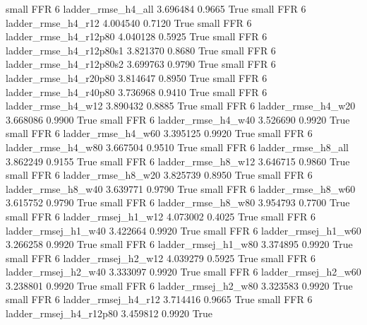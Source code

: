      small      FFR                 6       ladder_rmse_h4_all   3.696484      0.9665    True
     small      FFR                 6       ladder_rmse_h4_r12   4.004540      0.7120    True
     small      FFR                 6    ladder_rmse_h4_r12p80   4.040128      0.5925    True
     small      FFR                 6  ladder_rmse_h4_r12p80s1   3.821370      0.8680    True
     small      FFR                 6  ladder_rmse_h4_r12p80s2   3.699763      0.9790    True
     small      FFR                 6    ladder_rmse_h4_r20p80   3.814647      0.8950    True
     small      FFR                 6    ladder_rmse_h4_r40p80   3.736968      0.9410    True
     small      FFR                 6       ladder_rmse_h4_w12   3.890432      0.8885    True
     small      FFR                 6       ladder_rmse_h4_w20   3.668086      0.9900    True
     small      FFR                 6       ladder_rmse_h4_w40   3.526690      0.9920    True
     small      FFR                 6       ladder_rmse_h4_w60   3.395125      0.9920    True
     small      FFR                 6       ladder_rmse_h4_w80   3.667504      0.9510    True
     small      FFR                 6       ladder_rmse_h8_all   3.862249      0.9155    True
     small      FFR                 6       ladder_rmse_h8_w12   3.646715      0.9860    True
     small      FFR                 6       ladder_rmse_h8_w20   3.825739      0.8950    True
     small      FFR                 6       ladder_rmse_h8_w40   3.639771      0.9790    True
     small      FFR                 6       ladder_rmse_h8_w60   3.615752      0.9790    True
     small      FFR                 6       ladder_rmse_h8_w80   3.954793      0.7700    True
     small      FFR                 6      ladder_rmsej_h1_w12   4.073002      0.4025    True
     small      FFR                 6      ladder_rmsej_h1_w40   3.422664      0.9920    True
     small      FFR                 6      ladder_rmsej_h1_w60   3.266258      0.9920    True
     small      FFR                 6      ladder_rmsej_h1_w80   3.374895      0.9920    True
     small      FFR                 6      ladder_rmsej_h2_w12   4.039279      0.5925    True
     small      FFR                 6      ladder_rmsej_h2_w40   3.333097      0.9920    True
     small      FFR                 6      ladder_rmsej_h2_w60   3.238801      0.9920    True
     small      FFR                 6      ladder_rmsej_h2_w80   3.323583      0.9920    True
     small      FFR                 6      ladder_rmsej_h4_r12   3.714416      0.9665    True
     small      FFR                 6   ladder_rmsej_h4_r12p80   3.459812      0.9920    True
